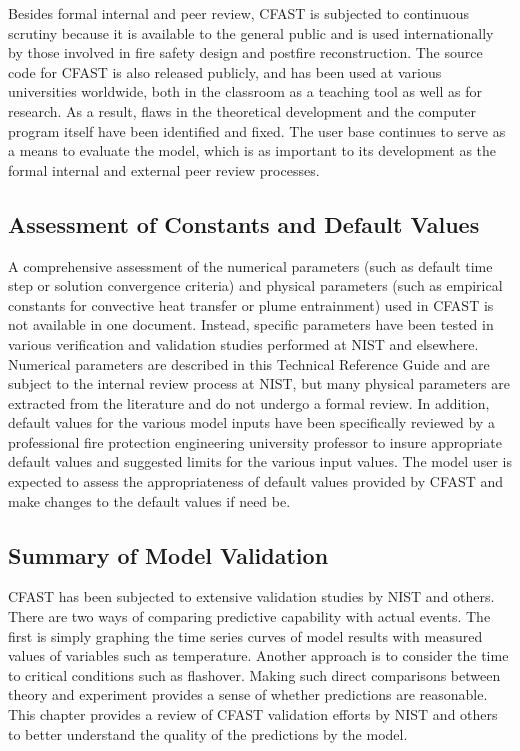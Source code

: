 Besides formal internal and peer review, CFAST is subjected to continuous scrutiny because it is available to the general public and is used internationally by those involved in fire safety design and postfire reconstruction. The source code for CFAST is also released publicly, and has been used at various universities worldwide, both in the classroom as a teaching tool as well as for research. As a result, flaws in the theoretical development and the computer program itself have been identified and fixed. The user base continues to serve as a means to evaluate the model, which is as important to its development as the formal internal and external peer review processes.

\subsection{Assessment of Constants and Default Values}

A comprehensive assessment of the numerical parameters (such as default time step or solution convergence criteria) and physical parameters (such as empirical constants for convective heat transfer or plume entrainment) used in CFAST is not available in one document. Instead, specific parameters have been tested in various verification and validation studies performed at NIST and elsewhere. Numerical parameters are described in this Technical Reference Guide and are subject to the internal review process at NIST, but many physical parameters are extracted from the literature and do not undergo a formal review. In addition, default values for the various model inputs have been specifically reviewed by a professional fire protection engineering university professor to insure appropriate default values and suggested limits for the various input values. The model user is expected to assess the appropriateness of default values provided by CFAST and make changes to the default values if need be.

\subsection{Summary of Model Validation} \label{sec:validationsummary}

CFAST has been subjected to extensive validation studies by NIST and others.  There are two ways of comparing predictive capability with actual events. The first is simply graphing the time series curves of model results with measured values of variables such as temperature. Another approach is to consider the time to critical conditions such as flashover. Making such direct comparisons between theory and experiment provides a sense of whether predictions are reasonable. This chapter provides a review of CFAST validation efforts by NIST and others to better understand the quality of the predictions by the model.


